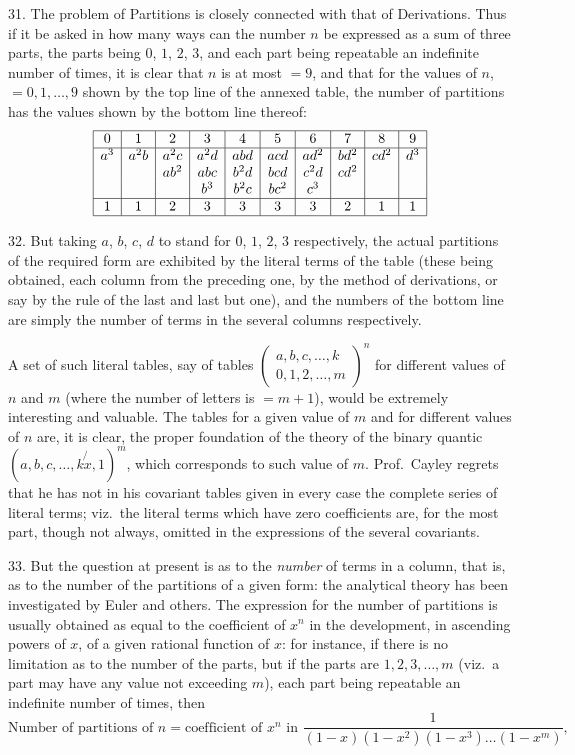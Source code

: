 \documentclass[11pt,a4paper]{article}
\begin{document}
31. The problem of Partitions is closely connected with that of Derivations. Thus if it be asked in how many ways can the number $n$ be expressed as a sum of three parts, the parts being $0$, $1$, $2$, $3$, and each part being repeatable an indefinite number of times, it is clear that $n$ is at most $= 9$, and that for the values of $n$, $= 0, 1, \ldots, 9$ shown by the top line of the annexed table, the number of partitions has the values shown by the bottom line thereof:
\[
\begin{array}{|c|c|c|c|c|c|c|c|c|c|}
\hline
0 & 1 & 2 & 3 & 4 & 5 & 6 & 7 & 8 & 9 \\
\hline
a^{3} & a^{2}b & a^{2}c & a^{2}d & abd & acd & ad^{2} & bd^{2} & cd^{2} & d^{3} \\
 & & ab^{2} & abc & b^{2}d & bcd & c^{2}d & cd^{2} & & \\
 & & & b^{3} & b^{2}c & bc^{2} & c^{3} & & & \\
\hline
1 & 1 & 2 & 3 & 3 & 3 & 3 & 2 & 1 & 1 \\
\hline
\end{array}
\]

32. But taking $a$, $b$, $c$, $d$ to stand for $0$, $1$, $2$, $3$ respectively, the actual partitions of the required form are exhibited by the literal terms of the table (these being obtained, each column from the preceding one, by the method of derivations, or say by the rule of the last and last but one), and the numbers of the bottom line are simply the number of terms in the several columns respectively.

A set of such literal tables, say of tables $\left(\begin{array}{c}a, b, c, \ldots, k\\ 0, 1, 2, \ldots, m\end{array}\right)^{n}$ for different values of $n$ and $m$ (where the number of letters is $= m + 1$), would be extremely interesting and valuable. The tables for a given value of $m$ and for different values of $n$ are, it is clear, the proper foundation of the theory of the binary quantic $(a, b, c, \ldots, k\!\not{x}, 1)^{m}$, which corresponds to such value of $m$. Prof.\ Cayley regrets that he has not in his covariant tables given in every case the complete series of literal terms; viz.\ the literal terms which have zero coefficients are, for the most part, though not always, omitted in the expressions of the several covariants.

33. But the question at present is as to the \textit{number} of terms in a column, that is, as to the number of the partitions of a given form: the analytical theory has been investigated by Euler and others. The expression for the number of partitions is usually obtained as equal to the coefficient of $x^{n}$ in the development, in ascending powers of $x$, of a given rational function of $x$: for instance, if there is no limitation as to the number of the parts, but if the parts are $1, 2, 3, \ldots, m$ (viz.\ a part may have any value not exceeding $m$), each part being repeatable an indefinite number of times, then
\[
\text{Number of partitions of } n = \text{coefficient of } x^{n} \text{ in } \frac{1}{(1-x)(1-x^{2})(1-x^{3})\ldots(1-x^{m})},
\]
\end{document}
